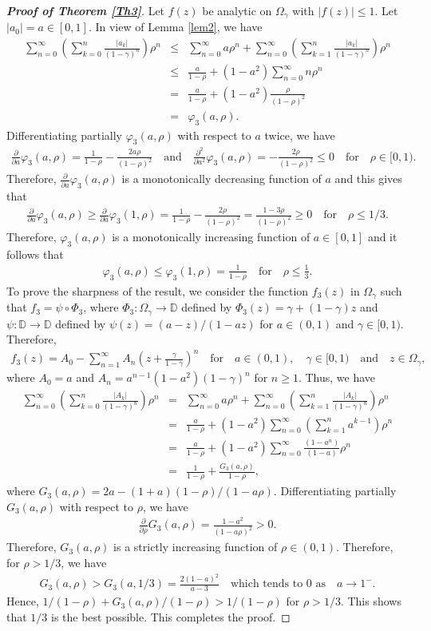 \documentclass[11pt,reqno]{amsart}
\newtheorem{open problem}{Open problem}[section]
\newcommand{\pa}{\partial}
\newcommand{\beas}{\begin{eqnarray*}}
\newcommand{\eeas}{\end{eqnarray*}}
\numberwithin{equation}{section}
\begin{document}
\begin{proof}[{\bf Proof of Theorem \ref{Th3}}]
Let $f(z)$ be analytic on $\Omega_{\gamma}$ with $|f(z)|\leq 1$. Let $|a_0|=a\in[0,1]$. In view of \textrm{Lemma \ref{lem2}}, we have 
\beas \sum_{n=0}^\infty \left(\sum_{k=0}^n \frac{|a_k|}{(1-\gamma)^n}\right) \rho^n&\leq& \sum_{n=0}^\infty a\rho^n+ \sum_{n=0}^\infty \left(\sum_{k=1}^n \frac{|a_k|}{(1-\gamma)^n}\right) \rho^n\\[2mm]
&\leq& \frac{a}{1-\rho}+(1-a^2)\sum_{n=0}^\infty n\rho^n\\
&=&\frac{a}{1-\rho}+(1-a^2)\frac{\rho}{(1-\rho)^2}\\&=&\varphi_3(a,\rho).\eeas
Differentiating partially $\varphi_3(a,\rho)$ with respect to $a$ twice, we have   
\beas\frac{\pa }{\pa a}\varphi_3(a,\rho)=\frac{1}{1-\rho} - \frac{2 a\rho}{(1-\rho)^2}\quad\text{and}\quad\frac{\pa^2 }{\pa a^2}\varphi_3(a,\rho)=-\frac{2\rho}{(1-\rho)^2}\leq 0\quad\text{for}\quad \rho\in[0,1).\eeas
Therefore, $\frac{\pa }{\pa a}\varphi_3(a,\rho)$ is a monotonically decreasing function of $a$ and this gives that 
\beas \frac{\pa}{\pa a}\varphi_3(a,\rho)\geq \frac{\pa}{\pa a}\varphi_3(1,\rho)=\frac{1}{1-\rho} - \frac{2\rho}{(1-\rho)^2}=\frac{1-3\rho}{(1-\rho)^2}\geq 0\quad\text{for} \quad\rho\leq 1/3.\eeas
Therefore, $\varphi_3(a,\rho)$ is a monotonically increasing function of $a\in[0,1]$ and it follows that 
\beas \varphi_3(a,\rho)\leq \varphi_3(1,\rho)=\frac{1}{1-\rho}\quad\text{for}\quad\rho\leq \frac{1}{3}.\eeas
\indent To prove the sharpness of the result, we consider the function $f_3(z)$ in $\Omega_{\gamma}$ such that $f_3=\psi\circ\Phi_3$, where $\Phi_3 : \Omega_{\gamma}\to\mathbb{D}$ defined by $\Phi_3(z)=\gamma+(1-\gamma)z$ and $\psi : \mathbb{D}\to\mathbb{D}$ defined by $\psi(z)=(a-z)/(1-az)$ for $a\in(0,1)$ and $\gamma\in[0,1)$. Therefore,
\beas f_3(z)
=A_0-\sum_{n=1}^\infty A_n \left(z+\frac{\gamma}{1-\gamma}\right)^n\quad\text{for}\quad a\in(0,1),\quad \gamma\in[0,1)\quad\text{and}\quad z\in\Omega_{\gamma},\eeas	
where $A_0=a$ and $A_n=a^{n-1}(1-a^2)(1-\gamma)^n$ for $n\geq 1$. Thus, we have
\beas\sum_{n=0}^\infty \left(\sum_{k=0}^n \frac{|A_k|}{(1-\gamma)^n}\right) \rho^n&=&\sum_{n=0}^\infty a\rho^n+\sum_{n=0}^\infty \left(\sum_{k=1}^n \frac{|A_k|}{(1-\gamma)^n}\right)\rho^n\\[2mm]
&=&\frac{a}{1-\rho}+(1-a^2)\sum_{n=0}^\infty \left(\sum_{k=1}^n a^{k-1}\right)\rho^n\\[2mm]
&=&\frac{a}{1-\rho}+(1-a^2) \sum_{n=0}^\infty \frac{(1-a^n)}{(1-a)}\rho^n\\[2mm]
&=&\frac{1}{1-\rho}+\frac{G_3(a,\rho)}{1-\rho},\eeas
where $G_3(a,\rho)=2a-(1+a)(1-\rho)/(1-a\rho)$.
Differentiating partially $G_3(a,\rho)$ with respect to $\rho$, we have
\beas\frac{\pa}{\pa \rho}G_3(a,\rho)=\frac{1-a^2}{(1-a\rho)^2}>0.\eeas
Therefore, $G_3(a,\rho)$ is a strictly increasing function of $\rho\in(0,1)$. Therefore, for $\rho>1/3$, we have 
\beas G_3(a,\rho)>G_3(a,1/3)=\frac{2(1-a)^2}{a-3}\quad\text{which tends to $0$ as}\quad a\to1^{-}.\eeas
Hence, $1/(1-\rho)+G_3(a,\rho)/(1-\rho)>1/(1-\rho)$ for $\rho>1/3$. This shows that $1/3$ is the best possible. This completes the proof.
\end{proof}
\end{document}

